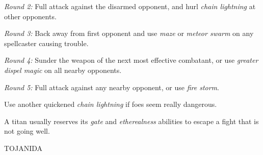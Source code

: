 \documentclass{article}
\begin{document}
\textit{Round 2: }Full attack against the disarmed opponent, and hurl \textit{chain 
lightning }at other opponents.

\textit{Round 3: }Back away from first opponent and use \textit{maze }or \textit{meteor 
swarm }on any spellcaster causing trouble.

\textit{Round 4: }Sunder the weapon of the next most effective combatant, or use 
\textit{greater dispel magic }on all nearby opponents.

\textit{Round 5: }Full attack against any nearby opponent, or use \textit{fire 
storm}.

Use another quickened \textit{chain lightning }if foes seem really dangerous.

A titan usually reserves its \textit{gate }and \textit{etherealness }abilities 
to escape a fight that is not going well.

\vspace{12pt}
{\LARGE{}TOJANIDA}
\end{document}
